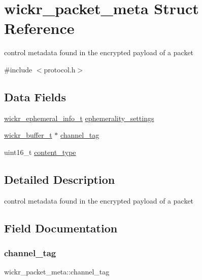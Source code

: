 \hypertarget{structwickr__packet__meta}{}\section{wickr\+\_\+packet\+\_\+meta Struct Reference}
\label{structwickr__packet__meta}


control metadata found in the encrypted payload of a packet  




{\ttfamily \#include $<$protocol.\+h$>$}

\subsection*{Data Fields}
\begin{DoxyCompactItemize}
\item 
\mbox{\hyperlink{structwickr__ephemeral__info}{wickr\+\_\+ephemeral\+\_\+info\+\_\+t}} \mbox{\hyperlink{structwickr__packet__meta_a0ef43c179038ba036fc9db17976b8b1e}{ephemerality\+\_\+settings}}
\item 
\mbox{\hyperlink{structwickr__buffer}{wickr\+\_\+buffer\+\_\+t}} $\ast$ \mbox{\hyperlink{structwickr__packet__meta_ab160a2ecfc6146ddf2ce40fe301c8ce9}{channel\+\_\+tag}}
\item 
uint16\+\_\+t \mbox{\hyperlink{structwickr__packet__meta_ada659f7c31d257c76edab5db52973f6e}{content\+\_\+type}}
\end{DoxyCompactItemize}


\subsection{Detailed Description}
control metadata found in the encrypted payload of a packet 

\subsection{Field Documentation}
\mbox{\label{structwickr__packet__meta_ab160a2ecfc6146ddf2ce40fe301c8ce9}} 
\subsubsection{\texorpdfstring{channel\+\_\+tag}{channel\_tag}}
{\footnotesize\ttfamily wickr\+\_\+packet\+\_\+meta\+::channel\+\_\+tag}

